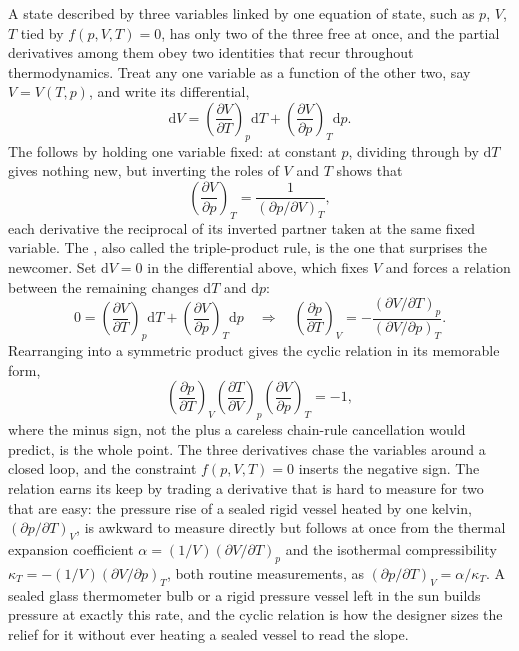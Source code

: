 A state described by three variables linked by one equation of state, such
as $p$, $V$, $T$ tied by $f(p,V,T) = 0$, has only two of the three free at
once, and the partial derivatives among them obey two identities that recur
throughout thermodynamics. Treat any one variable as a function of the other
two, say $V = V(T, p)$, and write its differential,
\[
\mathrm{d}V = \left(\frac{\partial V}{\partial T}\right)_p \mathrm{d}T +
\left(\frac{\partial V}{\partial p}\right)_T \mathrm{d}p.
\]
The  follows by holding one variable fixed: at
constant $p$, dividing through by $\mathrm{d}T$ gives nothing new, but
inverting the roles of $V$ and $T$ shows that
\[
\left(\frac{\partial V}{\partial p}\right)_T =
\frac{1}{(\partial p/\partial V)_T},
\]
each derivative the reciprocal of its inverted partner taken at the same
fixed variable. The , also called the triple-product
rule, is the one that surprises the newcomer. Set $\mathrm{d}V = 0$ in the
differential above, which fixes $V$ and forces a relation between the
remaining changes $\mathrm{d}T$ and $\mathrm{d}p$:
\[
0 = \left(\frac{\partial V}{\partial T}\right)_p \mathrm{d}T +
\left(\frac{\partial V}{\partial p}\right)_T \mathrm{d}p
\quad\Longrightarrow\quad
\left(\frac{\partial p}{\partial T}\right)_V =
-\frac{(\partial V/\partial T)_p}{(\partial V/\partial p)_T}.
\]
Rearranging into a symmetric product gives the cyclic relation in its
memorable form,
\[
\left(\frac{\partial p}{\partial T}\right)_V
\left(\frac{\partial T}{\partial V}\right)_p
\left(\frac{\partial V}{\partial p}\right)_T = -1,
\]
where the minus sign, not the plus a careless chain-rule cancellation would
predict, is the whole point. The three derivatives chase the variables
around a closed loop, and the constraint $f(p,V,T) = 0$ inserts the negative
sign. The relation earns its keep by trading a derivative that is hard to
measure for two that are easy: the pressure rise of a sealed rigid vessel
heated by one kelvin, $(\partial p/\partial T)_V$, is awkward to measure
directly but follows at once from the thermal expansion coefficient $\alpha =
(1/V)(\partial V/\partial T)_p$ and the isothermal compressibility $\kappa_T
= -(1/V)(\partial V/\partial p)_T$, both routine measurements, as
$(\partial p/\partial T)_V = \alpha/\kappa_T$. A sealed glass thermometer
bulb or a rigid pressure vessel left in the sun builds pressure at exactly
this rate, and the cyclic relation is how the designer sizes the relief for
it without ever heating a sealed vessel to read the slope.

